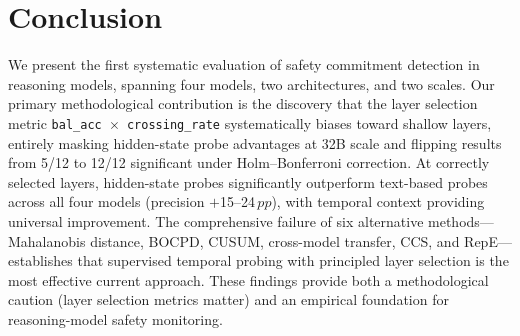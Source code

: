 \documentclass[11pt,a4paper]{article}
\newcommand{\pp}{\,pp}
\begin{document}
\section{Conclusion}
\label{sec:conclusion}

We present the first systematic evaluation of safety commitment detection in reasoning models, spanning four models, two architectures, and two scales.
Our primary methodological contribution is the discovery that the layer selection metric \texttt{bal\_acc $\times$ crossing\_rate} systematically biases toward shallow layers, entirely masking hidden-state probe advantages at 32B scale and flipping results from 5/12 to 12/12 significant under Holm--Bonferroni correction.
At correctly selected layers, hidden-state probes significantly outperform text-based probes across all four models (precision $+$15--24$\pp$), with temporal context providing universal improvement.
The comprehensive failure of six alternative methods---Mahalanobis distance, BOCPD, CUSUM, cross-model transfer, CCS, and RepE---establishes that supervised temporal probing with principled layer selection is the most effective current approach.
These findings provide both a methodological caution (layer selection metrics matter) and an empirical foundation for reasoning-model safety monitoring.

\end{document}

